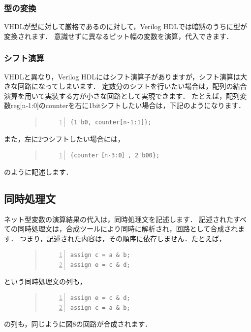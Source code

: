 \documentclass[a4paper,dvipdfmx]{jsarticle}
\begin{document}
\subsubsection{型の変換}
VHDLが型に対して厳格であるのに対して，Verilog HDLでは暗黙のうちに型が変換されます．
意識せずに異なるビット幅の変数を演算，代入できます．

\subsubsection{シフト演算}
VHDLと異なり，Verilog HDLにはシフト演算子がありますが，シフト演算は大きな回路になってしまいます．
定数分のシフトを行いたい場合は，配列の結合演算を用いて実装する方が小さな回路として実現できます．
たとえば，配列変数reg[n-1:0]のcounterを右に1bitシフトしたい場合は，下記のようになります．
\begin{figure}[H]
\begin{quote}
\begin{Verbatim}[frame=single, numbers=left, baselinestretch=0.8]
{1'b0, counter[n-1:1]};
\end{Verbatim}
\end{quote}
\end{figure}
また，左に2つシフトしたい場合には，
\begin{figure}[H]
\begin{quote}
\begin{Verbatim}[frame=single, numbers=left, baselinestretch=0.8]
{counter［n-3:0］, 2'b00};
\end{Verbatim}
\end{quote}
\end{figure}
のように記述します．

\subsection{同時処理文}
ネット型変数の演算結果の代入は，同時処理文を記述します．
記述されたすべての同時処理文は，合成ツールにより同時に解析され，回路として合成されます．
つまり，記述された内容は，その順序に依存しません．たとえば，
\begin{figure}[H]
\begin{quote}
\begin{Verbatim}[frame=single, numbers=left, baselinestretch=0.8]
assign c = a & b;
assign e = c & d;
\end{Verbatim}
\end{quote}
\end{figure}
という同時処理文の列も，
\begin{figure}[H]
\begin{quote}
\begin{Verbatim}[frame=single, numbers=left, baselinestretch=0.8]
assign e = c & d;
assign c = a & b;
\end{Verbatim}
\end{quote}
\end{figure}
の列も，同じように図8の回路が合成されます．
\end{document}
